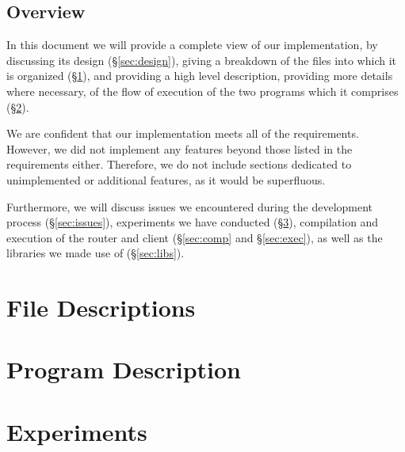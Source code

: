 \documentclass[10pt, a4paper]{article}
\begin{document}
\subsection{Overview}
\label{subsec:oview}

In this document we will provide a complete view of our implementation, by
discussing its design (\S\ref{sec:design}), giving a breakdown of the files into
which it is organized (\S\ref{sec:fdesc}), and providing a high level
description, providing more details where necessary, of the flow of execution of
the two programs which it comprises (\S\ref{sec:pdesc}).

We are confident that our implementation meets all of the requirements. However,
we did not implement any features beyond those listed in the requirements
either. Therefore, we do not include sections dedicated to unimplemented or
additional features, as it would be superfluous.

Furthermore, we will discuss issues we encountered during the development
process (\S\ref{sec:issues}), experiments we have conducted (\S\ref{sec:exp}),
compilation and execution of the router and client (\S\ref{sec:comp} and
\S\ref{sec:exec}), as well as the libraries we made use of (\S\ref{sec:libs}).



\section{File Descriptions}
\label{sec:fdesc}


\section{Program Description}
\label{sec:pdesc}


\section{Experiments}
\label{sec:exp}


\end{document}
